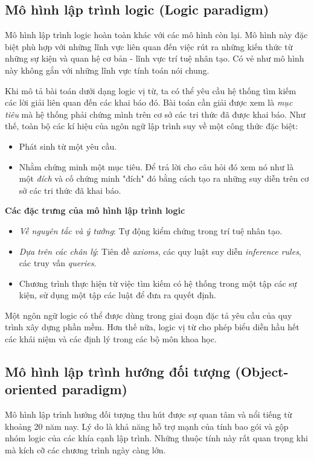 \documentclass[10pt, a4paper]{article}
\begin{document}
\subsection{Mô hình lập trình logic (Logic paradigm)}

Mô hình lập trình logic hoàn toàn khác với các mô hình còn lại. Mô hình này đặc biệt phù hợp với những lĩnh vực liên quan đến việc rút ra những kiến thức từ những sự kiện và quan hệ cơ bản - lĩnh vực trí tuệ nhân tạo. Có vẻ như mô hình này không gắn với những lĩnh vực tính toán nói chung.

Khi mô tả bài toán dưới dạng logic vị từ, ta có thể yêu cầu hệ thống tìm kiếm các lời giải liên quan đến các khai báo đó. Bài toán cần giải được xem là \emph{mục tiêu} mà hệ thống phải chứng mình trên cơ sở các tri thức đã được khai báo.
Như thế, toàn bộ các kí hiệu của ngôn ngữ lập trình suy về một công thức đặc biệt:
\begin{itemize}
\item Phát sinh từ một yêu cầu.
\item Nhằm chứng minh một mục tiêu. Để trả lời cho câu hỏi đó xem nó như là một \emph{đích} và cố chứng minh "đích" đó bằng cách tạo ra những suy diễn trên cơ sở các tri thức đã khai báo.
\end{itemize}

\textbf{Các đặc trưng của mô hình lập trình logic}
\begin{itemize}
\item \textit{Về nguyên tắc và ý tưởng}: Tự động kiểm chứng trong trí tuệ nhân tạo.
\item \textit{Dựa trên các chân lý}: Tiên đề \emph{axioms}, các quy luật suy diễn \emph{inference rules}, các truy vấn \emph{queries}.
\item Chương trình thực hiện từ việc tìm kiếm có hệ thống trong một tập các sự kiện, sử dụng một tập các luật để đưa ra quyết định.
\end{itemize}

Một ngôn ngữ logic có thể được dùng trong giai đoạn đặc tả yêu cầu của quy trình xây dựng phần mềm. Hơn thế nữa, logic vị từ cho phép biểu diễn hầu hết các khái niệm và các định lý trong các bộ môn khoa học.

\subsection{Mô hình lập trình hướng đối tượng (Object-oriented paradigm)}

Mô hình lập trình hướng đối tượng thu hút được sự quan tâm và nổi tiếng từ khoảng 20 năm nay. Lý do là khả năng hỗ trợ mạnh của tính bao gói và gộp nhóm logic của các khía cạnh lập trình. Những thuộc tính này rất quan trọng khi mà kích cỡ các chương trình ngày càng lớn.
\end{document}
